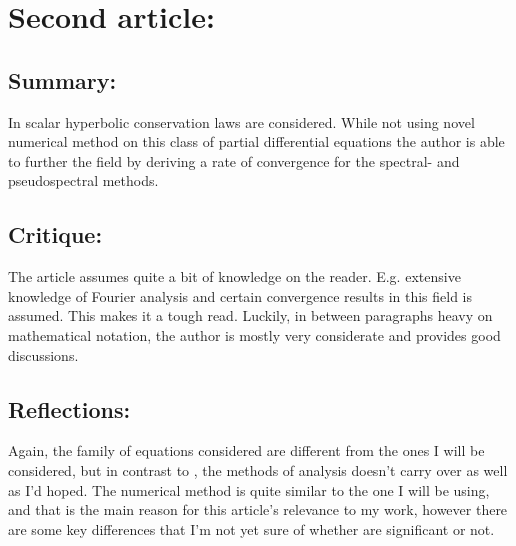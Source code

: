 \documentclass[11pt, a4paper]{article}
\begin{document}
\section*{Second article:}
\subsection*{Summary:}
In \cite{Schochet} scalar hyperbolic conservation laws are considered. While not using novel numerical method on this class of partial differential equations the author is able to further the field by deriving a rate of convergence for the spectral- and pseudospectral methods.

\subsection*{Critique:}
The article assumes quite a bit of knowledge on the reader. E.g. extensive knowledge of Fourier analysis and certain convergence results in this field is assumed. This makes it a tough read. Luckily, in between paragraphs heavy on mathematical notation, the author is mostly very considerate and provides good discussions.

\subsection*{Reflections:}
Again, the family of equations considered are different from the ones I will be considered, but in contrast to \cite{Cifani}, the methods of analysis doesn't carry over as well as I'd hoped. The numerical method is quite similar to the one I will be using, and that is the main reason for this article's relevance to my work, however there are some key differences that I'm not yet sure of whether are significant or not.

\newpage


\end{document}
